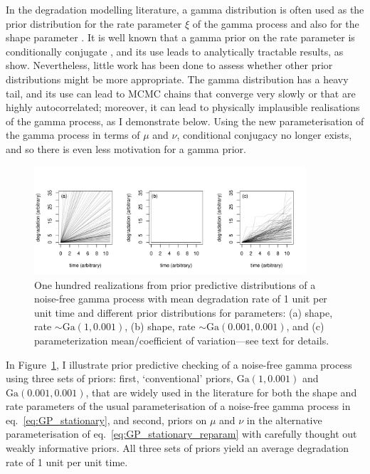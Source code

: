 In the degradation modelling literature, a gamma distribution is often used as the prior distribution for the rate parameter $\xi$ of the gamma process \citep{lawless2004} and also for the shape parameter \citep{rodriguez-picon2018}. It is well known that a gamma prior on the rate parameter is conditionally conjugate \citep{pradhan2011}, and its use leads to analytically tractable results, as \cite{lawless2004} show. Nevertheless, little work has been done to assess whether other prior distributions might be more appropriate. The gamma distribution has a heavy tail, and its use can lead to MCMC chains that converge very slowly or that are highly autocorrelated; moreover, it can lead to physically implausible realisations of the gamma process, as I demonstrate below. Using the new parameterisation of the gamma process in terms of $\mu$ and $\nu$, conditional conjugacy no longer exists, and so there is even less motivation for a gamma prior.

\begin{figure}
  \centering
  \includegraphics[width=0.9\textwidth]{./figures/ch-4/PPCs.pdf}
  \caption{One hundred realizations from prior predictive distributions of a noise-free gamma process with mean degradation rate of 1 unit per unit time and different prior distributions for parameters: (a) shape, rate $\sim \mbox{Ga}(1, 0.001)$, (b) shape, rate $\sim \mbox{Ga}(0.001, 0.001)$, and (c) parameterization mean/coefficient of variation---see text for details.}
  \label{fig:ppc}
\end{figure}

In Figure~\ref{fig:ppc}, I illustrate prior predictive checking of a noise-free gamma process using three sets of priors: first, `conventional' priors, $\mbox{Ga}(1, 0.001)$ and $\mbox{Ga}(0.001, 0.001)$, that are widely used in the literature for both the shape and rate parameters of the usual parameterisation of a noise-free gamma process in eq.~\eqref{eq:GP_stationary}, and second, priors on $\mu$ and $\nu$ in the alternative parameterisation of eq.~\eqref{eq:GP_stationary_reparam} with carefully thought out weakly informative priors. All three sets of priors yield an average degradation rate of 1 unit per unit time. 

